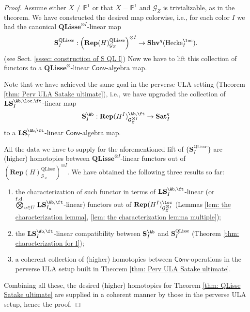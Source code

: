 \documentclass[10pt]{amsart}
\theoremstyle{remark}
\newcommand{\pjl}{\mathbb{P}^1}
\newcommand{\on}{\operatorname}
\newcommand{\cG}{\mathcal{G}}
\newcommand{\QLisse}{\on{QLisse}}
\newcommand{\Hecke}{\on{Hecke}}
\newcommand{\Conv}{\mathsf{Conv}}
\newcommand{\Ectensbig}{\stackrel{\on{f.d.}}{\bigotimes}}
\begin{document}
    \begin{proof}
     Assume either $X\ne \pjl$ or that $X=\pjl$ and $\cG_Z$ is trivializable, as in the theorem. We have constructed the desired map colorwise, i.e., for each color $I$ we had the canonical $\mathbf{QLisse}^{\otimes I}$-linear map
    \[\mathbf{S}^{\QLisse}_I: \left(\mathbf{Rep}(H)^{\QLisse}_{\cG_Z}\right)^{\otimes I}\rightarrow \mathbf{Shv}^q(\Hecke^{\loc}_{I}).\]
    (see Sect. \ref{sssec: construction of S QL I}) Now we have to lift this collection of functors to a $\mathbf{QLisse}^{\otimes}$-linear $\Conv$-algebra map.
    \medskip

    Note that we have achieved the same goal in the perverse ULA setting (Theorem \ref{thm: Perv ULA Satake ultimate}), i.e., we have upgraded the collection of $\mathbf{LS}^{\Ab,\loc,\ft}_I$-linear map
    \[\mathbf{S}^{\Ab}_I: \mathbf{Rep}(H^I)^{\Ab,\ft}_{\cG^{\boxtimes I}_Z}\rightarrow \mathbf{Sat}^q_I\]
    to a $\mathbf{LS}^{\Ab,\ft}_{?}$-linear $\Conv$-algebra map.
    \medskip

    All the data we have to supply for the aforementioned lift of $\{\mathbf{S}^{\QLisse}_I\}$ are (higher) homotopies between $\mathbf{QLisse}^{\otimes I}$-linear functors out of $\left(\mathbf{Rep}(H)^{\QLisse}_{\cG_Z}\right)^{\otimes I}$. We have obtained the following three results so far:
    \begin{enumerate}
        \item the characterization of such functor in terms of $\mathbf{LS}^{\Ab,\ft}_I$-linear (or $\Ectensbig_{u\in U}\mathbf{LS}^{\Ab,\ft}_{I_u}$-linear) functors out of $\mathbf{Rep}(H^I)^{\loc}_{\cG^{\boxtimes I}_Z}$ (Lemmas \ref{lem: the characterization lemma}, \ref{lem: the characterization lemma multiple});
        \item the $\mathbf{LS}^{\Ab,\ft}_I$-linear compatibility between $\mathbf{S}^{\Ab}_I$ and $\mathbf{S}^{\QLisse}_I$ (Theorem \ref{thm: characterization for I});
        \item a coherent collection of (higher) homotopies between $\Conv$-operations in the perverse ULA setup built in Theorem \ref{thm: Perv ULA Satake ultimate}.
    \end{enumerate}
    Combining all these, the desired (higher) homotopies for Theorem \ref{thm: QLisse Satake ultimate} are supplied in a coherent manner by those in the perverse ULA setup, hence the proof.   
    \end{proof}
    
\end{document}

